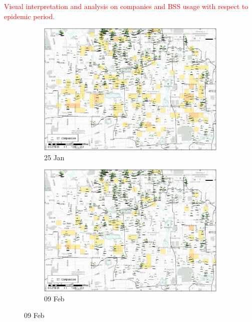 \documentclass[preprints,ijgi,submit,moreauthors]{Definitions/mdpi}
\begin{document}
\textcolor{red}{Visual interpretation and analysis on companies and BSS usage with respect to epidemic period.}
\begin{figure}[H]
    \centering
    \begin{subfigure}{.45\textwidth}
        \includegraphics[width=\textwidth]{Figures/Relation_with_POIs/POI_compD2020_01_25.eps}
        \caption{25 Jan}
    \end{subfigure}
    \begin{subfigure}{.45\textwidth}
        \includegraphics[width=\textwidth]{Figures/Relation_with_POIs/POI_compD2020_02_09.eps}
        \caption{09 Feb}
    \end{subfigure}


\end{figure}
\end{document}

